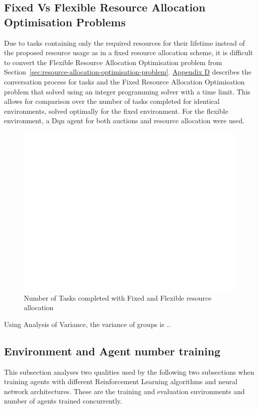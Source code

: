 \subsection{Fixed Vs Flexible Resource Allocation Optimisation Problems}
\label{subsec:fixed-vs-flexible-resource-allocation-optimisation-problems}
Due to tasks containing only the required resources for their lifetime instead of the proposed resource usage as in a
fixed resource allocation scheme, it is difficult to convert the Flexible Resource Allocation Optimisation problem from
Section~\ref{sec:resource-allocation-optimisation-problem}.
\hyperref[app:fixed-resource-allocation-optimisation-problem]{Appendix D} describes the conversation process for tasks
and the Fixed Resource Allocation Optimisation problem that solved using an integer programming solver with a time
limit. This allows for comparison over the number of tasks completed for identical environments, solved optimally for
the fixed environment. For the flexible environment, a Dqn agent for both auctions and resource allocation were used.

\begin{figure}[H]
    \centering
    \includegraphics[width=\textwidth]{figures/5_evaluation_figs/fixed_flexible_completed_tasks.png}
    \caption{Number of Tasks completed with Fixed and Flexible resource allocation}
    \label{fig:number-task-completed-fixed-flexible}
\end{figure}

Using Analysis of Variance, the variance of groups is .. %

\subsection{Environment and Agent number training}
\label{subsec:environment-and-agent-number-training}
This subsection analyses two qualities used by the following two subsections when training agents with different
Reinforcement Learning algorithms and neural network architectures. These are the training and evaluation environments
and number of agents trained concurrently.

